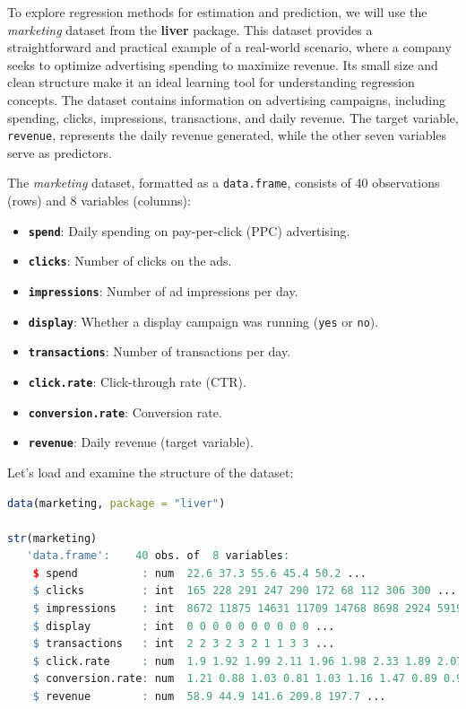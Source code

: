 \documentclass[
]{book}
\newcommand{\passthrough}[1]{#1}
\providecommand{\tightlist}{%
  \setlength{\itemsep}{0pt}\setlength{\parskip}{0pt}}
\theoremstyle{definition}
\theoremstyle{definition}
\theoremstyle{definition}
\theoremstyle{definition}
\theoremstyle{remark}
\begin{document}
To explore regression methods for estimation and prediction, we will use the \emph{marketing} dataset from the \textbf{liver} package. This dataset provides a straightforward and practical example of a real-world scenario, where a company seeks to optimize advertising spending to maximize revenue. Its small size and clean structure make it an ideal learning tool for understanding regression concepts. The dataset contains information on advertising campaigns, including spending, clicks, impressions, transactions, and daily revenue. The target variable, \passthrough{\lstinline!revenue!}, represents the daily revenue generated, while the other seven variables serve as predictors.

The \emph{marketing} dataset, formatted as a \passthrough{\lstinline!data.frame!}, consists of 40 observations (rows) and 8 variables (columns):

\begin{itemize}
\tightlist
\item
  \textbf{\passthrough{\lstinline!spend!}}: Daily spending on pay-per-click (PPC) advertising.\\
\item
  \textbf{\passthrough{\lstinline!clicks!}}: Number of clicks on the ads.\\
\item
  \textbf{\passthrough{\lstinline!impressions!}}: Number of ad impressions per day.\\
\item
  \textbf{\passthrough{\lstinline!display!}}: Whether a display campaign was running (\passthrough{\lstinline!yes!} or \passthrough{\lstinline!no!}).\\
\item
  \textbf{\passthrough{\lstinline!transactions!}}: Number of transactions per day.\\
\item
  \textbf{\passthrough{\lstinline!click.rate!}}: Click-through rate (CTR).\\
\item
  \textbf{\passthrough{\lstinline!conversion.rate!}}: Conversion rate.\\
\item
  \textbf{\passthrough{\lstinline!revenue!}}: Daily revenue (target variable).
\end{itemize}

Let's load and examine the structure of the dataset:

\begin{lstlisting}[language=R]
data(marketing, package = "liver")

str(marketing)
   'data.frame':    40 obs. of  8 variables:
    $ spend          : num  22.6 37.3 55.6 45.4 50.2 ...
    $ clicks         : int  165 228 291 247 290 172 68 112 306 300 ...
    $ impressions    : int  8672 11875 14631 11709 14768 8698 2924 5919 14789 14818 ...
    $ display        : int  0 0 0 0 0 0 0 0 0 0 ...
    $ transactions   : int  2 2 3 2 3 2 1 1 3 3 ...
    $ click.rate     : num  1.9 1.92 1.99 2.11 1.96 1.98 2.33 1.89 2.07 2.02 ...
    $ conversion.rate: num  1.21 0.88 1.03 0.81 1.03 1.16 1.47 0.89 0.98 1 ...
    $ revenue        : num  58.9 44.9 141.6 209.8 197.7 ...
\end{lstlisting}
\end{document}
